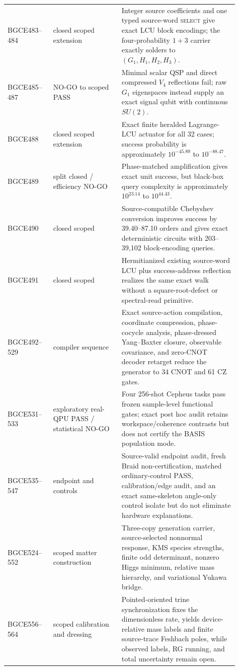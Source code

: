 \documentclass[11pt]{article}
\theoremstyle{definition}
\theoremstyle{remark}
\begin{document}
\begin{longtable}{>{\raggedright\arraybackslash}p{0.18\linewidth} >{\raggedright\arraybackslash}p{0.27\linewidth} >{\raggedright\arraybackslash}p{0.46\linewidth}}
BGCE483--484 & closed scoped extension & Integer source coefficients and one typed source-word \textsc{select} give exact LCU block encodings; the four-probability $1+3$ carrier exactly solders to $(G_1,H_1,H_2,H_3)$. \\
BGCE485--487 & NO-GO to scoped PASS & Minimal scalar QSP and direct compressed $V_4$ reflections fail; raw $G_1$ eigenspaces instead supply an exact signal qubit with continuous $SU(2)$. \\
BGCE488 & closed scoped extension & Exact finite heralded Lagrange-LCU actuator for all 32 cases; success probability is approximately $10^{-45.89}$ to $10^{-88.47}$. \\
BGCE489 & split closed / efficiency NO-GO & Phase-matched amplification gives exact unit success, but black-box query complexity is approximately $10^{23.14}$ to $10^{44.43}$. \\
BGCE490 & closed scoped & Source-compatible Chebyshev conversion improves success by 39.40--87.10 orders and gives exact deterministic circuits with 203--39,102 block-encoding queries. \\
BGCE491 & closed scoped & Hermitianized existing source-word LCU plus success-address reflection realizes the same exact walk without a square-root-defect or spectral-read primitive. \\
BGCE492--529 & compiler sequence & Exact source-action compilation, coordinate compression, phase-cocycle analysis, phase-dressed Yang--Baxter closure, observable covariance, and zero-CNOT decoder retarget reduce the generator to 34 CNOT and 61 CZ gates. \\
BGCE531--533 & exploratory real-QPU PASS / statistical NO-GO & Four 256-shot Cepheus tasks pass frozen sample-level functional gates; exact post hoc audit retains workspace/coherence contrasts but does not certify the BASIS population mode. \\
BGCE535--547 & endpoint and controls & Source-valid endpoint audit, fresh Braid non-certification, matched ordinary-control PASS, calibration/edge audit, and an exact same-skeleton angle-only control isolate but do not eliminate hardware explanations. \\
BGCE524--552 & scoped matter construction & Three-copy generation carrier, source-selected nonnormal response, KMS species strengths, finite odd determinant, nonzero Higgs minimum, relative mass hierarchy, and variational Yukawa bridge. \\
BGCE556--564 & scoped calibration and dressing & Pointed-oriented trine synchronization fixes the dimensionless rate, yields device-relative mass labels and finite source-trace Feshbach poles, while observed labels, RG running, and total uncertainty remain open. \\

\end{longtable}
\end{document}
